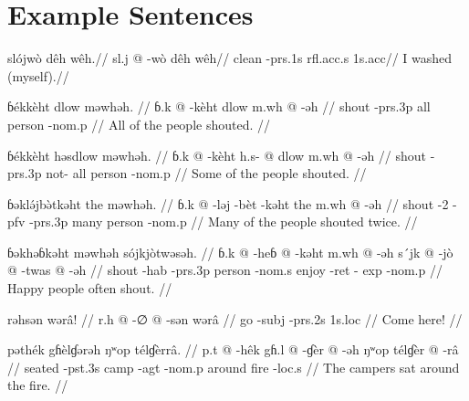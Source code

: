 \section{Example Sentences}

\ex
\begingl
\glpreamble slójwò dêh wêh.//
\gla sl.j @ -wò dêh wêh//
\glb clean -{\sc prs}.1s {\sc rfl}.{\sc acc}.s 1s.{\sc acc}//
\glft I washed (myself).//
\endgl
\xe

\pex
\a
\begingl
\glpreamble ɓékkèht dlow məwhəh. //
\gla ɓ.k @ -kèht dlow m.wh @ -əh //
\glb shout -{\sc prs}.3p all person -{\sc nom}.p //
\glft All of the people shouted. //
\endgl

\a
\begingl
\glpreamble ɓékkèht həsdlow məwhəh. //
\gla ɓ.k @ -kèht h.s- @ dlow m.wh @ -əh //
\glb shout -{\sc prs}.3p not- all person -{\sc nom}.p //
\glft Some of the people shouted. //
\endgl

\a
\begingl
\glpreamble ɓəklə́jbə̀tkəht the məwhəh. //
\gla ɓ.k @ -ləj -bèt -kəht the m.wh @ -əh //
\glb shout -2 -{\sc pfv} -{\sc prs}.3p many person -{\sc nom}.p //
\glft Many of the people shouted twice. //
\endgl

\a
\begingl
\glpreamble ɓəkhəɓkəht məwhəh sójkjòtwəsəh. //
\gla ɓ.k @ -heɓ @ -kəht m.wh @ -əh s´jk @ -jò @ -twas @ -əh //
\glb shout -{\sc hab} -{\sc prs}.3p person -{\sc nom}.s enjoy -{\sc ret} -{\sc
exp} -{\sc nom}.p //
\glft Happy people often shout. //
\endgl
\xe

\ex
\begingl
\glpreamble rəhsən wərâ! //
\gla r.h @ -∅ @ -sən wərâ //
\glb go -{\sc subj} -{\sc prs}.2s 1s.{\sc loc} //
\glft Come here! //
\endgl
\xe

\ex
\begingl
\glpreamble pəthék gɦèlɠərəh ŋʷop télɠèrrâ. //
\gla p.t @ -hêk gɦ.l @ -ɠèr @ -əh ŋʷop télɠèr @ -râ //
\glb seated -{\sc pst}.3s camp -{\sc agt} -{\sc nom}.p around fire -{\sc loc}.s
//
\glft The campers sat around the fire. //
\endgl
\xe
